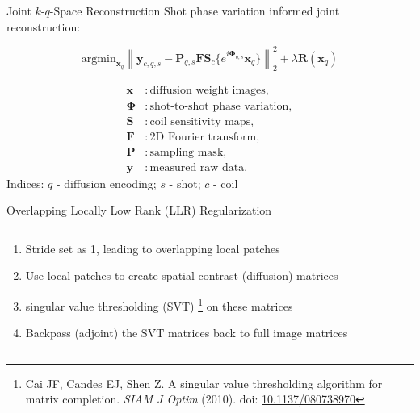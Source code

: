 \documentclass[hyperref={colorlinks=true,linkcolor=blue}, aspectratio=169]{beamer}
\begin{document}
	\begin{frame}{Joint $k$-$q$-Space Reconstruction}
		Shot phase variation informed joint reconstruction:
		
		\begin{equation}
			\mathrm{argmin}_{\mathbf{x}_q} \left\lVert \mathbf{y}_{c,q,s} - \mathbf{P}_{q,s} \mathbf{F} \mathbf{S}_c \{ e^{i \mathbf{\Phi}_{q,s}} \mathbf{x}_{q} \} \right\rVert_2^2 + \lambda \mathbf{R} (\mathbf{x}_q)
		\end{equation}
	
		\begin{equation}
			\begin{aligned}
				\mathbf{x} &: \text{diffusion weight images}, \\
				\mathbf{\Phi} &: \text{shot-to-shot phase variation}, \\
				\mathbf{S} &: \text{coil sensitivity maps}, \\
				\mathbf{F} &: \text{2D Fourier transform}, \\
				\mathbf{P} &: \text{sampling mask}, \\
				\mathbf{y} &: \text{measured raw data}.
			\end{aligned}
		\end{equation}
		\vspace{0.5em}
		Indices: $q$ - diffusion encoding; $s$ - shot; $c$ - coil
	\end{frame}

	\begin{frame}{Overlapping Locally Low Rank (LLR) Regularization}
		\begin{columns}
			\begin{column}{0.4\textwidth}
				\begin{enumerate}
					\item Stride set as 1, leading to overlapping local patches
					\item Use local patches to create spatial-contrast (diffusion) matrices
					\item singular value thresholding (SVT) \footnote{Cai JF, Candes EJ, Shen Z. A singular value thresholding algorithm for matrix completion. \textit{SIAM J Optim} (2010). doi: \href{https://doi.org/10.1137/080738970}{10.1137/080738970}} on these matrices
					\item Backpass (adjoint) the SVT matrices back to full image matrices
				\end{enumerate}
			\end{column}
			\begin{column}{0.6\textwidth}
			\end{column}
		\end{columns}
	\end{frame}
\end{document}
